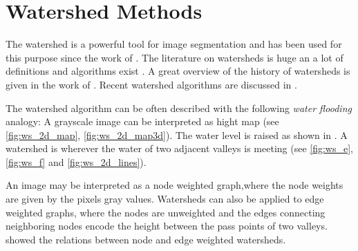 \section{Watershed Methods}\label{sec:rw_watershed_methods}

The watershed is a powerful tool for image segmentation and
has been used for this purpose since the work of
\citet{beucher_1979_workshop}.
The literature on watersheds is huge an 
a lot of definitions and algorithms exist
\citep{vinent_1991_pami,beuchner_1994_waterfall,najman_1994_sp,
roerdink_2000_finf,bertrand_2005_jmiv,cousty_2009_pami,
meyer_2012_corr,meyer_2012_corr2}.
A great overview  of the history of watersheds 
is given in the work of \citet{meyer_2012_corr}.
Recent watershed algorithms are discussed in \citep{meyer_2012_corr2}.

The watershed algorithm can be often described with the following  \emph{water flooding} analogy:
A grayscale  image can be interpreted as hight map (see \cref{fig:ws_2d_map}, \cref{fig:ws_2d_map3d}).
The water level is raised as shown in .
A watershed is wherever the water of two adjacent valleys is meeting (see \cref{fig:ws_e}, \cref{fig:ws_f} and \cref{fig:ws_2d_lines}).


An image may be interpreted as a node weighted graph,where the node weights
are given by the pixels gray values.
Watersheds can also be applied to edge weighted graphs, where the nodes are unweighted 
and the edges connecting neighboring nodes encode the height between the pass points of two valleys.
\citet{meyer_2012_corr2} showed the relations between node and edge weighted watersheds. 





